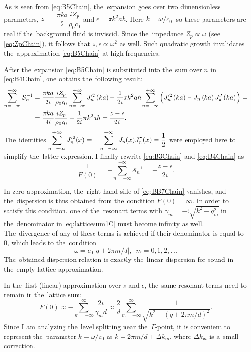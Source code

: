 As is seen from \cref{eq:B5Chain}, the~expansion goes over two dimensionless parameters, $z~=~\dfrac{\pi k a}{2}\dfrac{i Z_p}{\rho_0 c_0}$ and
$\epsilon = \pi k^2 a h$.
Here $k=\omega/c_0$, so these parameters are real if the~background fluid is inviscid.
Since the~impedance $Z_p \propto \omega$ (see \cref{eq:ZpChain}), it follows that $z,\epsilon \propto \omega^2$ as well.
Such quadratic growth invalidates the~approximation \cref{eq:B5Chain} at high frequencies.

After the~expansion \cref{eq:B5Chain} is substituted into the~sum over $n$ in \cref{eq:B4Chain}, one obtains the~following result:
\begin{align}
\label{eq:B6Chain}
\sum_{n=-\infty}^{+\infty}\mathcal{S}_n^{-1} &= \dfrac{\pi k a}{2i}\dfrac{i Z_p}{\rho_0 c_0} \sum_{n=-\infty}^{+\infty} J'^{2}_{n}\left(k a\right) - \dfrac{1}{2i} \pi k^2 a h \sum_{n=-\infty}^{+\infty} \Big(J'^2_n\left(k a\right)-J_n\left(k a\right)J''_{n}\left(k a\right)\Big) = \notag \\
&= \dfrac{\pi k a}{4i}\dfrac{i Z_p}{\rho_0 c_0} - \dfrac{1}{2i} \pi k^2 a h = \frac{z - \epsilon}{2i}.
\end{align}
The~identities $\displaystyle\sum_{n=-\infty}^{+\infty} J'^2_n(x) = -\displaystyle\sum_{n=-\infty}^{+\infty} J_n(x) J''_n(x)=\frac12$ were employed here to simplify the~latter expression.
I finally rewrite \cref{eq:B3Chain} and \cref{eq:B4Chain} as
\begin{equation}
\label{eq:BB7Chain}
\frac{1}{F(0)} = -\sum_{n=-\infty}^{+\infty}\mathcal{S}_n^{-1} = -\frac{z - \epsilon}{2i}.
\end{equation}


In zero approximation, the~right-hand side of \cref{eq:BB7Chain} vanishes, and the~dispersion is thus obtained from the~condition $F(0)= \infty$.
In order to satisfy this condition, one of the~resonant terms with $\gamma_m= -i \sqrt{k^2 - q_m^2}$ in the~denominator in \cref{eq:latticesum1C} must become infinity as well.
The~divergence of any of these terms is achieved if their denominator is equal to 0, which leads to the~condition
\begin{equation}
\label{eq:B0Chain}
\omega=c_0\,| q \pm 2\pi m/d |, \,\,\, m=0,1,2,\dots.
 \end{equation}
The~obtained dispersion relation is exactly the~linear dispersion for sound in the~empty lattice approximation.

In the~first (linear) approximation over $z$ and $\epsilon$, the~same resonant terms need to remain in the~lattice sum:
\begin{equation}
\label{eq:BF1Chain}
F(0) \approx -\sum_{m=-\infty}^{\infty} \frac{2i}{\gamma_m d} \approx \frac{2}{d} \sum_{m=-\infty}^{\infty} \frac{1}{\sqrt{k^2 - (q + 2\pi m/d)^2}}.
\end{equation}
Since I am analyzing the~level splitting near the~$\Gamma$-point, it is convenient to represent the~parameter $k=\omega/c_0$ as $k = 2\pi m/d +\Delta k_m $, where $\Delta k_m$ is a~small correction.

